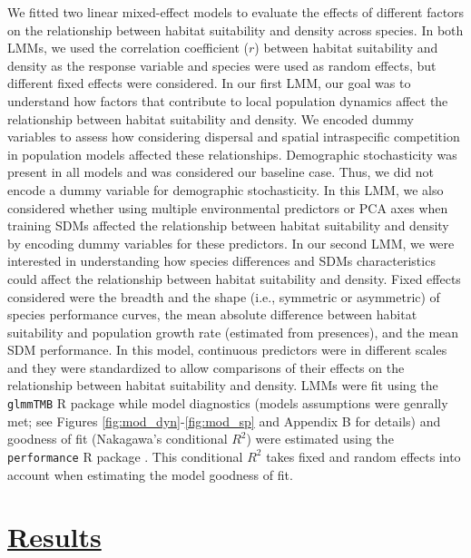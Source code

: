 We fitted two linear mixed-effect models to evaluate the effects of different factors on the relationship between habitat suitability and density across species. In both LMMs, we used the correlation coefficient ($r$) between habitat suitability and density as the response variable and species were used as random effects, but different fixed effects were considered. In our first LMM, our goal was to understand how factors that contribute to local population dynamics affect the relationship between habitat suitability and density. We encoded dummy variables to assess how considering dispersal and spatial intraspecific competition in population models affected these relationships. Demographic stochasticity was present in all models and was considered our baseline case. Thus, we did not encode a dummy variable for demographic stochasticity. In this LMM, we also considered whether using multiple environmental predictors or PCA axes when training SDMs affected the relationship between habitat suitability and density by encoding dummy variables for these predictors. In our second LMM, we were interested in understanding how species differences and SDMs characteristics could affect the relationship between habitat suitability and density. Fixed effects considered were the breadth and the shape (i.e., symmetric or asymmetric) of species performance curves, the mean absolute difference between habitat suitability and population growth rate (estimated from presences), and the mean SDM performance. In this model, continuous predictors were in different scales and they were standardized to allow comparisons of their effects on the relationship between habitat suitability and density. LMMs were fit using the \texttt{glmmTMB} R package \parencite{brooks2017} while model diagnostics (models assumptions were genrally met; see Figures \ref{fig:mod_dyn}-\ref{fig:mod_sp} and Appendix B for details) and goodness of fit (Nakagawa's conditional $R^2$) were estimated using the \texttt{performance} R package \parencite{ludecke2021}. This conditional $R^2$ takes fixed and random effects into account when estimating the model goodness of fit. 
\section*{\textbf{\underline{Results}}}


